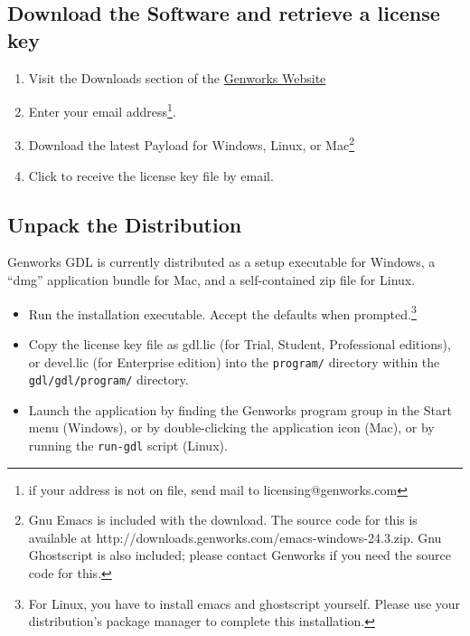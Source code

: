 \documentclass [11pt]{book}
\begin{document}
\subsection{Download the Software and retrieve a license key}

\label{subsec:downloadthesoftwareandretrievealicensekey}



\begin{enumerate}

\item Visit the Downloads section of the \href{http://genworks.com}{Genworks Website}

\item Enter your email address\footnote{if your address is not on file, send mail to licensing@genworks.com}.

\item Download the latest Payload for Windows, Linux, or Mac\footnote{Gnu Emacs is included with the download. The source code for this 
is available at http://downloads.genworks.com/emacs-windows-24.3.zip. Gnu Ghostscript
is also included; please contact Genworks if you need the source code for this.}

\item Click to receive the license key file by email.

\end{enumerate}



\subsection{Unpack the Distribution}

\label{subsec:unpackthedistribution}

Genworks GDL is currently distributed as a setup executable for Windows,
a ``dmg'' application bundle for Mac, and a self-contained zip file for Linux.

\begin{itemize}

\item Run the installation executable. Accept the defaults when prompted.\footnote{For Linux, you have to install emacs and ghostscript yourself. Please use your distribution's package manager to complete this installation.}

\item Copy the license key file as gdl.lic (for Trial,
	 Student, Professional editions), or devel.lic (for Enterprise edition) into the \texttt{program/} directory within the \texttt{gdl/gdl/program/} directory.

\item Launch the application by finding the Genworks program group in the Start menu (Windows), or by double-clicking the application icon (Mac), or by running the \texttt{run-gdl} script (Linux).

\end{itemize}
\end{document}
